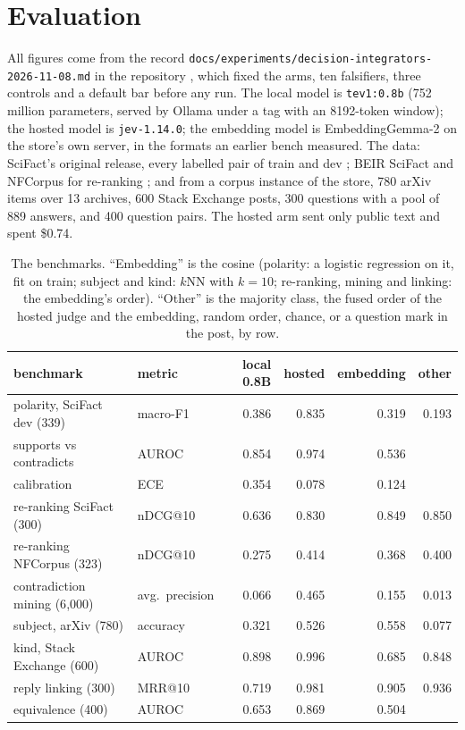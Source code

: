 \documentclass[11pt]{article}
\theoremstyle{definition}
\theoremstyle{plain}
\theoremstyle{remark}
\newcommand{\code}[1]{\texttt{#1}}
\begin{document}
\section{Evaluation}\label{sec:evaluation}
All figures come from the record \code{docs/experiments/decision-integrators-2026-11-08.md}
in the repository \citep{serranocalva2026palace}, which fixed the arms, ten falsifiers, three
controls and a default bar before any run. The local model is \code{tev1:0.8b} (752 million
parameters, served by Ollama under a tag with an 8192-token window); the hosted model is
\code{jev-1.14.0}; the embedding model is EmbeddingGemma-2 on the store's own server, in the formats
an earlier bench measured. The data: SciFact's original release, every labelled pair of train and
dev \citep{wadden2020scifact}; BEIR SciFact and NFCorpus for re-ranking
\citep{thakur2021beir,boteva2016nfcorpus}; and from a corpus instance of the store, 780 arXiv items
over 13 archives, 600 Stack Exchange posts, 300 questions with a pool of 889 answers, and 400
question pairs. The hosted arm sent only public text and spent \$0.74.

\begin{table}[t]
\centering\small
\begin{tabular}{@{}llrrrr@{}}
\toprule
benchmark & metric & local 0.8B & hosted & embedding & other \\
\midrule
polarity, SciFact dev (339) & macro-F1 & 0.386 & 0.835 & 0.319 & 0.193 \\
\quad supports vs contradicts & AUROC & 0.854 & 0.974 & 0.536 & \\
\quad calibration & ECE & 0.354 & 0.078 & 0.124 & \\
re-ranking SciFact (300) & nDCG@10 & 0.636 & 0.830 & 0.849 & 0.850 \\
re-ranking NFCorpus (323) & nDCG@10 & 0.275 & 0.414 & 0.368 & 0.400 \\
contradiction mining (6{,}000) & avg.\ precision & 0.066 & 0.465 & 0.155 & 0.013 \\
subject, arXiv (780) & accuracy & 0.321 & 0.526 & 0.558 & 0.077 \\
kind, Stack Exchange (600) & AUROC & 0.898 & 0.996 & 0.685 & 0.848 \\
reply linking (300) & MRR@10 & 0.719 & 0.981 & 0.905 & 0.936 \\
equivalence (400) & AUROC & 0.653 & 0.869 & 0.504 & \\
\bottomrule
\end{tabular}
\caption{The benchmarks. ``Embedding'' is the cosine (polarity: a logistic regression on it, fit
on train; subject and kind: $k$NN with $k = 10$; re-ranking, mining and linking: the embedding's
order). ``Other'' is the majority class, the fused order of the hosted judge and the embedding,
random order, chance, or a question mark in the post, by row.}\label{tab:results}
\end{table}
\end{document}
